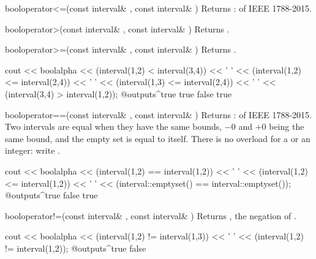 \begin{deffun}{bool}{operator<=}{(const interval\& , const interval\& )}
  Returns :  of
  IEEE 1788-2015.
\end{deffun}

\begin{deffun}{bool}{operator>}{(const interval\& , const interval\& )}
  Returns .
\end{deffun}

\begin{deffun}{bool}{operator>=}{(const interval\& , const interval\& )}
  Returns .
\begin{example}
cout << boolalpha << (interval(1,2) < interval(3,4)) << ' '
     << (interval(1,2) <= interval(2,4)) << ' '
     << (interval(1,3) <= interval(2,4)) << ' '
     << (interval(3,4) > interval(1,2));
@outputs^true true false true~
\end{example}
\end{deffun}

\begin{deffun}{bool}{operator==}{(const interval\& , const interval\& )}
  Returns :  of IEEE 1788-2015.
  Two intervals are equal when they have the same bounds, $-0$ and $+0$ being
  the same bound, and the empty set is equal to itself. There is no
  overload for a  or an integer: write
  .\newinvfive
\begin{example}
cout << boolalpha << (interval(1,2) == interval(1,2)) << ' '
     << (interval(1,2) <= interval(1,2)) << ' '
     << (interval::emptyset() == interval::emptyset());
@outputs^true false true~
\end{example}
\end{deffun}

\begin{deffun}{bool}{operator!=}{(const interval\& , const interval\& )}
  Returns , the negation of \code{==}.\newinvfive
\begin{example}
cout << boolalpha << (interval(1,2) != interval(1,3)) << ' '
     << (interval(1,2) != interval(1,2));
@outputs^true false~
\end{example}
\end{deffun}

